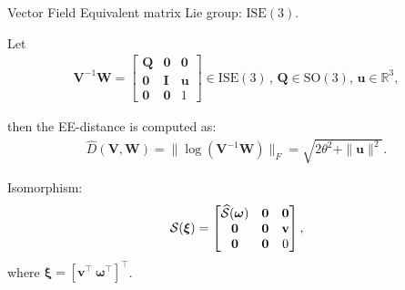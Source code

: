 \begin{frame}{Vector Field}
            Equivalent matrix Lie group: $\text{ISE}(3)$.

            Let
            \begin{align*}
                \mathbf{V}^{-1}\mathbf{W} = \begin{bmatrix}
                    \mathbf{Q} & \mathbf{0} & \mathbf{0}\\
                    \mathbf{0} & \mathbf{I} & \mathbf{u}\\
                    \mathbf{0} & \mathbf{0} & 1
                \end{bmatrix} \in \text{ISE}(3)\,,\,  \mathbf{Q}\in\text{SO}(3),\,\mathbf{u}\in\mathbb{R}^3,
            \end{align*}

            then the EE-distance is computed as:
            \begin{align*}
                \widehat{D}(\mathbf{V},\mathbf{W}) = \bigl\|\log(\mathbf{V}^{-1}\mathbf{W})\bigr\|_F = \sqrt{2\theta^2 + \|\mathbf{u}\|^2}.
            \end{align*}

            Isomorphism:
            \begin{align*}
                \SL[\boldsymbol{\xi}]= \begin{bmatrix}
                    \widehat{\mathcal{S}}(\boldsymbol{\omega}) & \mathbf{0} & \mathbf{0}\\
                    \mathbf{0} & \mathbf{0} & \mathbf{v}\\
                    \mathbf{0} & \mathbf{0} & 0
                \end{bmatrix},
            \end{align*}
            where $\boldsymbol{\xi} = [\mathbf{v}^\top\ \boldsymbol{\omega}^\top]^\top$.

           
            

\end{frame}

